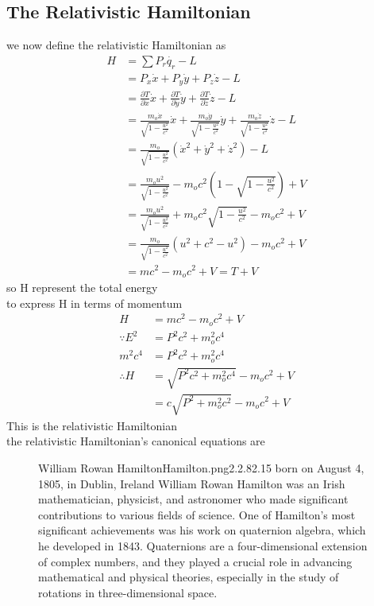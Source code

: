 \documentclass{article}
\begin{document}
\subsection{The Relativistic Hamiltonian}
we now define the relativistic Hamiltonian as 
\begin{align*}
    H &= \sum P_r\dot{q_r}  - L\\
      &= P_x\dot{x} + P_y\dot{y} + P_z\dot{z} - L\\
      &= \frac{\partial T}{\partial \dot{x}}\dot{x} + \frac{\partial T}{\partial \dot{y}}\dot{y} + \frac{\partial T}{\partial \dot{z}}\dot{z} -L\\
      &= \frac{m_o \dot{x}}{\sqrt{1 - \frac{u^2}{c^2}}}\dot{x} + \frac{m_o \dot{y}}{\sqrt{1 - \frac{u^2}{c^2}}}\dot{y} + \frac{m_o \dot{z}}{\sqrt{1 - \frac{u^2}{c^2}}}\dot{z} -L \\
      &= \frac{m_o}{\sqrt{1 - \frac{u^2}{c^2}}} \left(\dot{x}^2 + \dot{y}^2 + \dot{z}^2\right) - L\\
      &= \frac{m_o u^2}{\sqrt{1 - \frac{u^2}{c^2}}} - m_o c^2\left(1- \sqrt{1 - \frac{u^2}{c^2}}\right) + V\\
      &= \frac{m_o u^2}{\sqrt{1 - \frac{u^2}{c^2}}} + m_o c^2 \sqrt{1 - \frac{u^2}{c^2}} - m_o c^2  + V\\
      &= \frac{m_o}{\sqrt{1 - \frac{u^2}{c^2}}}\left(u^2 + c^2 - u^2\right) - m_o c^2  + V\\
      &= m c^2 - m_o c^2  + V = T + V
\end{align*}
so H represent the total energy \\
to express H in terms of momentum
\begin{align*}
    H &= m c^2 - m_o c^2  + V \\  
    \because E^2 &= P^2c^2 + m_o^2 c^4 \\
    m^2 c^4 &= P^2c^2 + m_o^2 c^4 \\
    \therefore H &= \sqrt{P^2c^2 + m_o^2 c^4} - m_o c^2  + V\\
    &= c\sqrt{P^2 + m_o^2 c^2} - m_o c^2  + V
\end{align*}
This is the relativistic Hamiltonian\\
the relativistic Hamiltonian's canonical equations are 
\begin{figure}[b]
\begin{enrichment}{William Rowan Hamilton}{Hamilton.png}{2.2}{.82}{.15}
    born on August 4, 1805, in Dublin, Ireland William Rowan Hamilton was an Irish mathematician, physicist, and astronomer who made significant contributions to various fields of science.
    One of Hamilton's most significant achievements was his work on quaternion algebra, which he developed in 1843. Quaternions are a four-dimensional extension of complex numbers, and they played a crucial role in advancing mathematical and physical theories, especially in the study of rotations in three-dimensional space.
\end{enrichment}
\end{figure}
\end{document}
